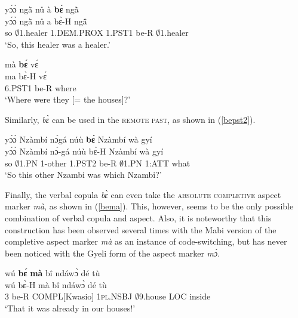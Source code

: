 \begin{exe} 
\ex\label{bepst1a}
  \glll   yɔ́ɔ̀ ngã̀ nû à {\bfseries bɛ́} ngã̀  \\
          yɔ́ɔ̀ ngã̀ nû a bɛ̀-H ngã̂ \\
         so $\emptyset$1.healer 1.DEM.PROX 1.PST1 be-R $\emptyset$1.healer   \\
    \trans `So, this healer was a healer.'
\end{exe}


\begin{exe} 
\ex\label{bepst1b}
  \glll     mà {\bfseries bɛ́} vɛ́ \\ 
            ma bɛ̀-H vɛ́ \\
              6.PST1 be-R where \\
    \trans `Where were they [= the houses]?'
\end{exe}


\noindent Similarly, {\itshape bɛ̀} can be used in the \textsc{remote past}, as shown in (\ref{bepst2}).

\begin{exe} 
\ex\label{bepst2}
  \glll  yɔ́ɔ̀ Nzàmbí nɔ́gá núù {\bfseries bɛ́} Nzàmbí wà gyí\\
        yɔ́ɔ̀ Nzàmbí nɔ́-gá núù bɛ̀-H Nzàmbí wà gyí \\
          so $\emptyset$1.PN 1-other 1.PST2 be-R  $\emptyset$1.PN 1:ATT what   \\
    \trans `So this other Nzambi was which Nzambi?'
\end{exe}

Finally, the verbal copula {\itshape bɛ̀} can even take the \textsc{absolute completive} aspect marker {\itshape mà}, as shown in (\ref{bema}). This, however, seems to be the only possible combination of verbal copula and aspect. Also, it is noteworthy that this construction has been observed several times with the Mabi version of the completive aspect marker {\itshape mà} as an instance of code-switching, but has never been noticed with the Gyeli form of the aspect marker {\itshape mɔ̀}.


\begin{exe} 
\ex\label{bema}
  \glll  wú {\bfseries bɛ́} {\bfseries mà} bî ndáwɔ̀ dé tù \\
         wú bɛ̀-H mà bî ndáwɔ̀ dé tù \\
         3 be-R COMPL[Kwasio] 1\textsc{pl}.NSBJ $\emptyset$9.house LOC inside   \\
    \trans `That it was already in our houses!'
\end{exe}

